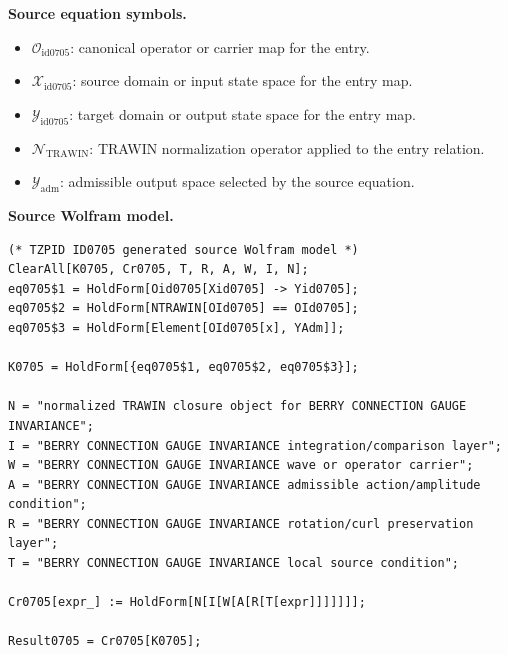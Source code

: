 \begin{minipage}[t]{0.49\linewidth}
\begingroup
\small
\raggedright
\textbf{Source equation symbols.}\par
\begin{itemize}[leftmargin=1.35em,itemsep=1pt,topsep=1pt,parsep=0pt]
    \item $\mathcal{O}_{\mathrm{id0705}}$: canonical operator or carrier map for the entry.
    \item $\mathcal{X}_{\mathrm{id0705}}$: source domain or input state space for the entry map.
    \item $\mathcal{Y}_{\mathrm{id0705}}$: target domain or output state space for the entry map.
    \item $\mathcal{N}_{\mathrm{TRAWIN}}$: TRAWIN normalization operator applied to the entry relation.
    \item $\mathcal{Y}_{\mathrm{adm}}$: admissible output space selected by the source equation.
\end{itemize}
\endgroup
\end{minipage}\hfill
\begin{minipage}[t]{0.47\linewidth}
\begingroup
\scriptsize
\raggedright
\textbf{Source Wolfram model.}\par
\begin{Verbatim}[fontsize=\tiny,breaklines=true,breakanywhere=true]
(* TZPID ID0705 generated source Wolfram model *)
ClearAll[K0705, Cr0705, T, R, A, W, I, N];
eq0705$1 = HoldForm[Oid0705[Xid0705] -> Yid0705];
eq0705$2 = HoldForm[NTRAWIN[OId0705] == OId0705];
eq0705$3 = HoldForm[Element[OId0705[x], YAdm]];

K0705 = HoldForm[{eq0705$1, eq0705$2, eq0705$3}];

N = "normalized TRAWIN closure object for BERRY CONNECTION GAUGE INVARIANCE";
I = "BERRY CONNECTION GAUGE INVARIANCE integration/comparison layer";
W = "BERRY CONNECTION GAUGE INVARIANCE wave or operator carrier";
A = "BERRY CONNECTION GAUGE INVARIANCE admissible action/amplitude condition";
R = "BERRY CONNECTION GAUGE INVARIANCE rotation/curl preservation layer";
T = "BERRY CONNECTION GAUGE INVARIANCE local source condition";

Cr0705[expr_] := HoldForm[N[I[W[A[R[T[expr]]]]]]];

Result0705 = Cr0705[K0705];
\end{Verbatim}
\endgroup
\end{minipage}

